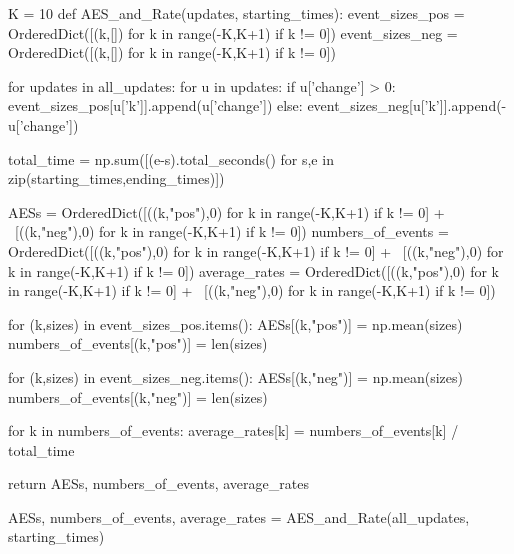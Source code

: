 K = 10
def AES_and_Rate(updates, starting_times):
    event_sizes_pos = OrderedDict([(k,[]) for k in range(-K,K+1) if k != 0])
    event_sizes_neg = OrderedDict([(k,[]) for k in range(-K,K+1) if k != 0])
    
    for updates in all_updates:
        for u in updates:
            if u['change'] > 0:
                event_sizes_pos[u['k']].append(u['change'])
            else:
                event_sizes_neg[u['k']].append(-u['change'])
                
    total_time = np.sum([(e-s).total_seconds() for s,e in zip(starting_times,ending_times)])
                
    AESs = OrderedDict([((k,"pos"),0) for k in range(-K,K+1) if k != 0] + \
                       [((k,"neg"),0) for k in range(-K,K+1) if k != 0])
    numbers_of_events = OrderedDict([((k,"pos"),0) for k in range(-K,K+1) if k != 0] + \
                                   [((k,"neg"),0) for k in range(-K,K+1) if k != 0])
    average_rates = OrderedDict([((k,"pos"),0) for k in range(-K,K+1) if k != 0] + \
                                [((k,"neg"),0) for k in range(-K,K+1) if k != 0])
    
    for (k,sizes) in event_sizes_pos.items():
        AESs[(k,"pos")] = np.mean(sizes)
        numbers_of_events[(k,"pos")] = len(sizes)
        
    for (k,sizes) in event_sizes_neg.items():
        AESs[(k,"neg")] = np.mean(sizes)
        numbers_of_events[(k,"neg")] = len(sizes)
        
    for k in numbers_of_events:
        average_rates[k] = numbers_of_events[k] / total_time
        
    return AESs, numbers_of_events, average_rates
            

AESs, numbers_of_events, average_rates = AES_and_Rate(all_updates, starting_times)